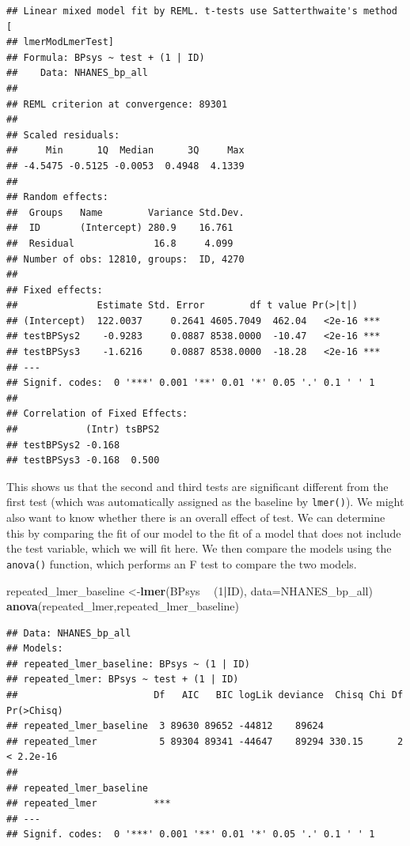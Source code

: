 \documentclass[12pt,]{book}
\newenvironment{Shaded}{\begin{snugshade}}{\end{snugshade}}
\newcommand{\DataTypeTok}[1]{\textcolor[rgb]{0.13,0.29,0.53}{#1}}
\newcommand{\DecValTok}[1]{\textcolor[rgb]{0.00,0.00,0.81}{#1}}
\newcommand{\KeywordTok}[1]{\textcolor[rgb]{0.13,0.29,0.53}{\textbf{#1}}}
\newcommand{\NormalTok}[1]{#1}
\newcommand{\OperatorTok}[1]{\textcolor[rgb]{0.81,0.36,0.00}{\textbf{#1}}}
\newcommand{\StringTok}[1]{\textcolor[rgb]{0.31,0.60,0.02}{#1}}
\begin{document}
\begin{verbatim}
## Linear mixed model fit by REML. t-tests use Satterthwaite's method [
## lmerModLmerTest]
## Formula: BPsys ~ test + (1 | ID)
##    Data: NHANES_bp_all
## 
## REML criterion at convergence: 89301
## 
## Scaled residuals: 
##     Min      1Q  Median      3Q     Max 
## -4.5475 -0.5125 -0.0053  0.4948  4.1339 
## 
## Random effects:
##  Groups   Name        Variance Std.Dev.
##  ID       (Intercept) 280.9    16.761  
##  Residual              16.8     4.099  
## Number of obs: 12810, groups:  ID, 4270
## 
## Fixed effects:
##              Estimate Std. Error        df t value Pr(>|t|)    
## (Intercept)  122.0037     0.2641 4605.7049  462.04   <2e-16 ***
## testBPSys2    -0.9283     0.0887 8538.0000  -10.47   <2e-16 ***
## testBPSys3    -1.6216     0.0887 8538.0000  -18.28   <2e-16 ***
## ---
## Signif. codes:  0 '***' 0.001 '**' 0.01 '*' 0.05 '.' 0.1 ' ' 1
## 
## Correlation of Fixed Effects:
##            (Intr) tsBPS2
## testBPSys2 -0.168       
## testBPSys3 -0.168  0.500
\end{verbatim}

This shows us that the second and third tests are significant different from the first test (which was automatically assigned as the baseline by \texttt{lmer()}). We might also want to know whether there is an overall effect of test. We can determine this by comparing the fit of our model to the fit of a model that does not include the test variable, which we will fit here. We then compare the models using the \texttt{anova()} function, which performs an F test to compare the two models.

\begin{Shaded}
\begin{Highlighting}[]
\NormalTok{repeated_lmer_baseline <-}\KeywordTok{lmer}\NormalTok{(BPsys }\OperatorTok{~}\StringTok{ }\NormalTok{(}\DecValTok{1}\OperatorTok{|}\NormalTok{ID), }\DataTypeTok{data=}\NormalTok{NHANES_bp_all)}
\KeywordTok{anova}\NormalTok{(repeated_lmer,repeated_lmer_baseline)}
\end{Highlighting}
\end{Shaded}

\begin{verbatim}
## Data: NHANES_bp_all
## Models:
## repeated_lmer_baseline: BPsys ~ (1 | ID)
## repeated_lmer: BPsys ~ test + (1 | ID)
##                        Df   AIC   BIC logLik deviance  Chisq Chi Df Pr(>Chisq)
## repeated_lmer_baseline  3 89630 89652 -44812    89624                         
## repeated_lmer           5 89304 89341 -44647    89294 330.15      2  < 2.2e-16
##                           
## repeated_lmer_baseline    
## repeated_lmer          ***
## ---
## Signif. codes:  0 '***' 0.001 '**' 0.01 '*' 0.05 '.' 0.1 ' ' 1
\end{verbatim}
\end{document}
